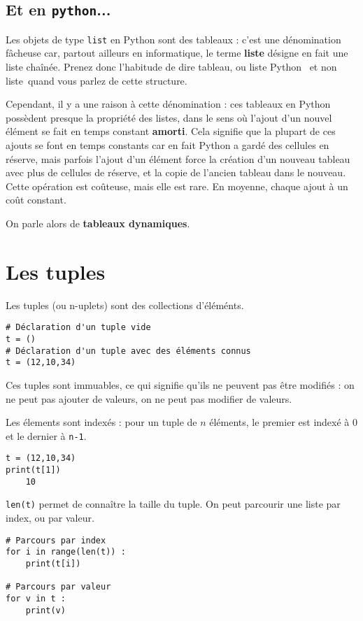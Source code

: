 \subsection{Et en \texttt{python}...}

Les objets de type \texttt{list} en Python sont des tableaux : c'est une 
dénomination fâcheuse car, partout ailleurs en informatique, le terme
\textbf{liste} désigne en fait une liste chaînée. Prenez donc
l'habitude de dire \og tableau\fg, ou \og liste Python \fg\ et non \og liste\fg\ quand vous parlez de cette
structure.

Cependant, il y a une raison à cette dénomination : ces tableaux en Python possèdent presque 
la propriété des listes, dans le sens où l'ajout d'un nouvel élément se fait en temps constant 
\textbf{amorti}. Cela signifie que la plupart de ces ajouts se font en temps constants car en fait 
Python a \og gardé des cellules en réserve\fg, mais parfois l'ajout d'un élément force la création 
d'un nouveau tableau avec plus de cellules de réserve, et la copie de l'ancien tableau dans le 
nouveau. Cette opération est coûteuse, mais elle 
est rare. En moyenne, chaque ajout à un coût constant.

On parle alors de \textbf{tableaux dynamiques}.

\section{Les tuples}
Les tuples (ou n-uplets) sont des collections d'éléménts.
\begin{lstlisting}
# Déclaration d'un tuple vide
t = ()
# Déclaration d'un tuple avec des éléments connus
t = (12,10,34)
\end{lstlisting}

Ces tuples sont immuables, ce qui signifie qu'ils ne peuvent pas être modifiés : on ne peut pas ajouter de valeurs, on ne peut pas modifier de valeurs. 

Les élements sont indexés : pour un tuple de $n$ éléments, le premier est indexé à 0 et le dernier à \lstinline{n-1}. 
\begin{lstlisting}
t = (12,10,34)
print(t[1])
    10 
\end{lstlisting}

\lstinline{len(t)} permet de connaître la taille du tuple. On peut parcourir une liste par index, ou par valeur. 
\begin{lstlisting}
# Parcours par index
for i in range(len(t)) :
    print(t[i])
    
# Parcours par valeur
for v in t :
    print(v)
\end{lstlisting}


